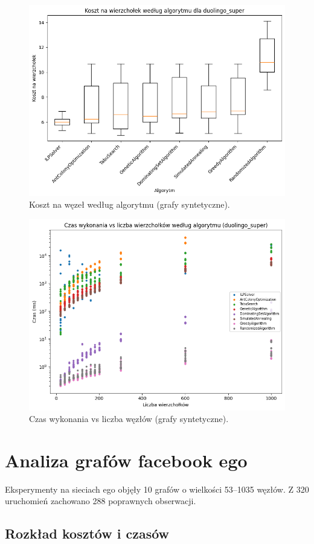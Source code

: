 \begin{figure}[H]
  \centering
  \includegraphics[width=0.7\linewidth]{assets/figures/synthetic_cost_per_node.png}
  \caption{Koszt na węzeł według algorytmu (grafy syntetyczne).}
  \label{fig:synthetic_cost_per_node}
\end{figure}

\begin{figure}[H]
  \centering
  \includegraphics[width=0.7\linewidth]{assets/figures/synthetic_time_scatter.png}
  \caption{Czas wykonania vs liczba węzłów (grafy syntetyczne).}
  \label{fig:synthetic_time_scatter}
\end{figure}

\section{Analiza grafów facebook ego}

Eksperymenty na sieciach ego objęły 10 grafów o wielkości 53--1035 węzłów. Z 320 uruchomień zachowano 288 poprawnych obserwacji.

\subsection{Rozkład kosztów i czasów}

